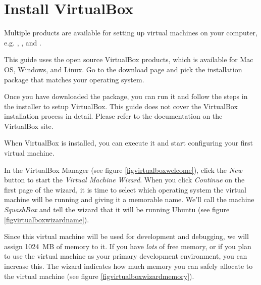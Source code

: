 \documentclass[ebook,10pt,twoside,openright]{memoir}
\begin{document}
\section{Install VirtualBox} \label{secinstallvirtualbox}

Multiple products are available for setting up virtual machines on your computer, e.g. , , and .

This guide uses the open source VirtualBox products, which is available for Mac OS, Windows, and Linux. Go to the download page and pick the installation package that matches your operating system.


Once you have downloaded the package, you can run it and follow the steps in the installer to setup VirtualBox. This guide does not cover the VirtualBox installation process in detail. Please refer to the documentation on the VirtualBox site.

When VirtualBox is installed, you can execute it and start configuring your first virtual machine.


In the VirtualBox Manager (see figure \ref{figvirtualboxwelcome}), click the \emph{New} button to start the \emph{Virtual Machine Wizard}. When you click \emph{Continue} on the first page of the wizard, it is time to select which operating system the virtual machine will be running and giving it a memorable name. We'll call the machine \emph{SquashBox} and tell the wizard that it will be running Ubuntu (see figure \ref{figvirtualboxwizardname}).


Since this virtual machine will be used for development and debugging, we will assign 1024~MB of memory to it. If you have \emph{lots} of free memory, or if you plan to use the virtual machine as your primary development environment, you can increase this. The wizard indicates how much memory you can safely allocate to the virtual machine (see figure \ref{figvirtualboxwizardmemory}).
\end{document}
